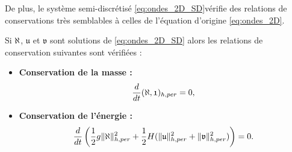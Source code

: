 De plus, le système semi-discrétisé \eqref{eq:ondes_2D_SD}vérifie des relations de conservations très semblables à celles de l'équation d'origine \eqref{eq:ondes_2D}.

\begin{proposition}
Si $\aleph$, $\mathfrak{u}$ et $\mathfrak{v}$ sont solutions de \eqref{eq:ondes_2D_SD} alors les relations de conservation suivantes sont vérifiées :
\begin{itemize}
\item \textbf{Conservation de la masse :}
\begin{equation}
\dfrac{d}{dt} (\aleph, \mathfrak{1})_{h,per} = 0,
\end{equation}
\item \textbf{Conservation de l'énergie :}
\begin{equation}
\dfrac{d}{dt} \left( \dfrac{1}{2} g \| \aleph \|_{h,per}^2 + \dfrac{1}{2} H ( \| \mathfrak{u} \|_{h,per}^2 +  \| \mathfrak{v} \|_{h,per}^2) \right) = 0.
\end{equation}
\end{itemize}
\end{proposition}

